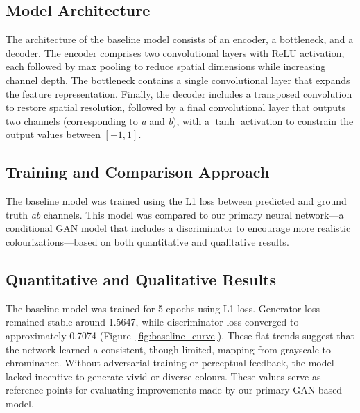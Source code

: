 \documentclass{article} %
\begin{document}
\subsection{Model Architecture}

The architecture of the baseline model consists of an encoder, a bottleneck, and a decoder. The encoder comprises two convolutional layers with ReLU activation, each followed by max pooling to reduce spatial dimensions while increasing channel depth. The bottleneck contains a single convolutional layer that expands the feature representation. Finally, the decoder includes a transposed convolution to restore spatial resolution, followed by a final convolutional layer that outputs two channels (corresponding to \textit{a} and \textit{b}), with a $\tanh$ activation to constrain the output values between $[-1, 1]$.

\subsection{Training and Comparison Approach}

The baseline model was trained using the L1 loss between predicted and ground truth \textit{ab} channels. This model was compared to our primary neural network---a conditional GAN model that includes a discriminator to encourage more realistic colourizations---based on both quantitative and qualitative results.

\subsection{Quantitative and Qualitative Results}

The baseline model was trained for 5 epochs using L1 loss. Generator loss remained stable around 1.5647, while discriminator loss converged to approximately 0.7074 (Figure~\ref{fig:baseline_curve}). These flat trends suggest that the network learned a consistent, though limited, mapping from grayscale to chrominance. Without adversarial training or perceptual feedback, the model lacked incentive to generate vivid or diverse colours. These values serve as reference points for evaluating improvements made by our primary GAN-based model.
\end{document}
